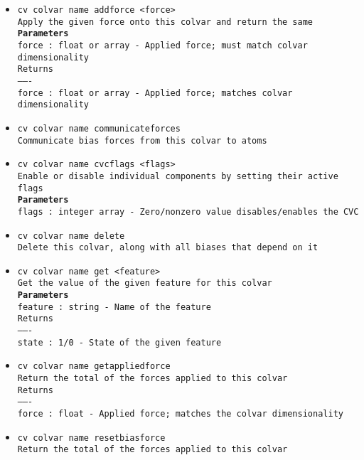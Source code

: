 \begin{itemize}
\item \texttt{cv colvar name addforce <force>}
\\
\texttt{Apply the given force onto this colvar and return the same}
\\
\texttt{\textbf{Parameters}}
\\
\texttt{force : float or array - Applied force; must match colvar dimensionality}
\\
\texttt{Returns}
\\
\texttt{-------}
\\
\texttt{force : float or array - Applied force; matches colvar dimensionality}
\item \texttt{cv colvar name communicateforces}
\\
\texttt{Communicate bias forces from this colvar to atoms}
\item \texttt{cv colvar name cvcflags <flags>}
\\
\texttt{Enable or disable individual components by setting their active flags}
\\
\texttt{\textbf{Parameters}}
\\
\texttt{flags : integer array - Zero/nonzero value disables/enables the CVC}
\item \texttt{cv colvar name delete}
\\
\texttt{Delete this colvar, along with all biases that depend on it}
\item \texttt{cv colvar name get <feature>}
\\
\texttt{Get the value of the given feature for this colvar}
\\
\texttt{\textbf{Parameters}}
\\
\texttt{feature : string - Name of the feature}
\\
\texttt{Returns}
\\
\texttt{-------}
\\
\texttt{state : 1/0 - State of the given feature}
\item \texttt{cv colvar name getappliedforce}
\\
\texttt{Return the total of the forces applied to this colvar}
\\
\texttt{Returns}
\\
\texttt{-------}
\\
\texttt{force : float - Applied force; matches the colvar dimensionality}
\item \texttt{cv colvar name resetbiasforce}
\\
\texttt{Return the total of the forces applied to this colvar}

\end{itemize}
